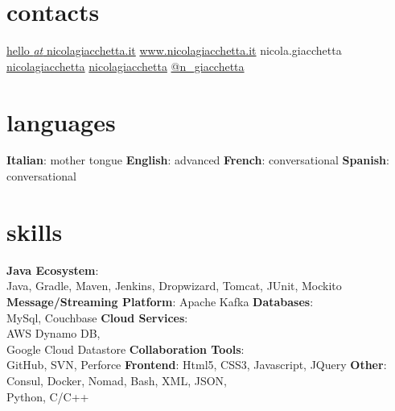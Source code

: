 
\newcommand*{\img}[1]{%
    \raisebox{-.1\baselineskip}{%
        \texttt{[image: \#1]}%
    }%
}



\begin{aside} %
\section{\normalfont contacts}
\myNumberUK
\href{mailto:\myEmail}{hello {\emph{at}} nicolagiacchetta.it}
\href{http://www.nicolagiacchetta.it/}{www.nicolagiacchetta.it}
\raisebox{-0.4ex}{\skype{}} nicola.giacchetta
 \hspace{0.02cm} \href{https://github.com/nicolagiacchetta}{ nicolagiacchetta}
 \hspace{0.02cm} \href{https://www.linkedin.com/in/nicolagiacchetta}{ nicolagiacchetta}
 \hspace{0.02cm} \href{https://twitter.com/N_Giacchetta}{ @n\_giacchetta}
~
\vspace{-0.1cm}
\section{\normalfont languages}
\textbf{Italian}: mother tongue
\textbf{English}: advanced
\textbf{French}: conversational
\textbf{Spanish}: conversational
~
\vspace{-0.1cm}
\section{\normalfont skills}
\textbf{Java Ecosystem}:\\ Java, Gradle, Maven, Jenkins, Dropwizard, Tomcat, JUnit, Mockito
\textbf{Message/Streaming Platform}: Apache Kafka
\textbf{Databases}:\\ MySql, Couchbase
\textbf{Cloud Services}:\\ AWS Dynamo DB,\\ Google Cloud Datastore
\textbf{Collaboration Tools}:\\ GitHub, SVN, Perforce 
\textbf{Frontend}: Html5, CSS3, Javascript, JQuery
\textbf{Other}: Consul, Docker, Nomad, Bash, XML, JSON,\\ Python, C/C++ 
~
\vspace{-0.1cm}

\end{aside}
